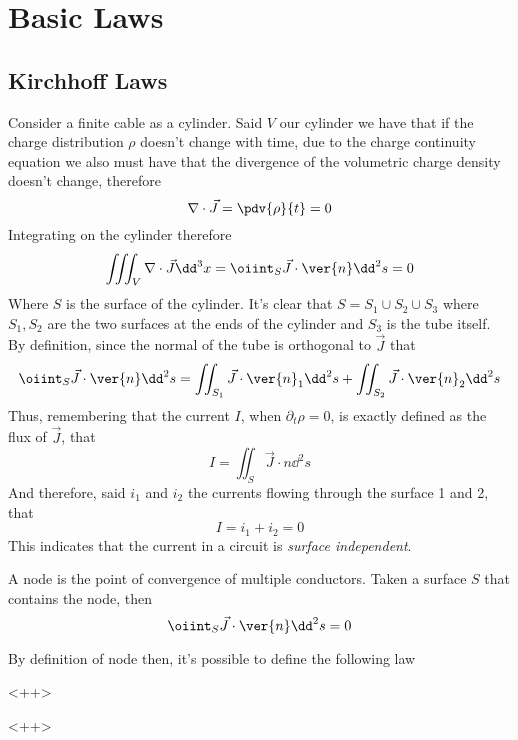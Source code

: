 \documentclass[../electromagnetism.tex]{subfiles}
\begin{document}
\section{Basic Laws}
\subsection{Kirchhoff Laws}
Consider a finite cable as a cylinder. Said $V$ our cylinder we have that if the charge distribution $\rho$ doesn't change with time, due to the charge continuity equation we also must have that the divergence of the volumetric charge density doesn't change, therefore
\begin{equation*}
	\nabla\cdot\vec{J}=\pdv{\rho}{t}=0
\end{equation*}
Integrating on the cylinder therefore
\begin{equation*}
	\iiint_V\nabla\cdot\vec{J}\dd^3{x}=\oiint_S\vec{J}\cdot\ver{n}\dd^2{s}=0
\end{equation*}
Where $S$ is the surface of the cylinder. It's clear that $S=S_1\cup S_2\cup S_3$ where $S_1,S_2$ are the two surfaces at the ends of the cylinder and $S_3$ is the tube itself.\\
By definition, since the normal of the tube is orthogonal to $\vec{J}$ that
\begin{equation*}
	\oiint_S\vec{J}\cdot\ver{n}\dd^2{s}=\iint_{S_1}\vec{J}\cdot\ver{n}_1\dd^2{s}+\iint_{S_2}\vec{J}\cdot\ver{n}_2\dd^2{s}
\end{equation*}
Thus, remembering that the current $I$, when $\partial_t\rho=0$, is exactly defined as the flux of $\vec{J}$, that 
\begin{equation*}
	I=\iint_S\vec{J}\cdot{n}\dd^2{s}
\end{equation*}
And therefore, said $i_1$ and $i_2$ the currents flowing through the surface 1 and 2, that
\begin{equation}
	I=i_1+i_2=0
	\label{eq:kirchhoffintro.dc}
\end{equation}
This indicates that the current in a circuit is \textit{surface independent}.\\
\begin{dfn}[Node]
	A node is the point of convergence of multiple conductors. Taken a surface $S$ that contains the node, then 
	\begin{equation*}
		\oiint_S\vec{J}\cdot\ver{n}\dd^2{s}=0
	\end{equation*}
\end{dfn}
By definition of node then, it's possible to define the following law
\begin{thm}<++>
\end{thm}<++>
\end{document}
